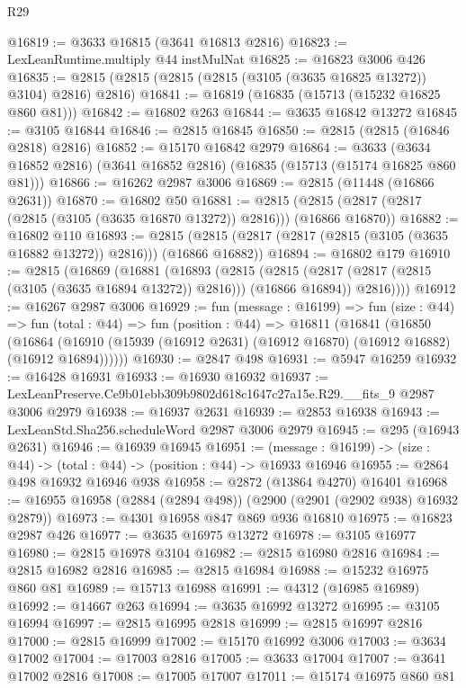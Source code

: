 \begin{lexlean}{R29}
\begin{coremodule}
@16819 := @3633 @16815 (@3641 @16813 @2816)
@16823 := LexLeanRuntime.multiply @44 instMulNat
@16825 := @16823 @3006 @426
@16835 := @2815 (@2815 (@2815 (@2815 (@3105 (@3635 @16825 @13272)) @3104) @2816) @2816)
@16841 := @16819 (@16835 (@15713 (@15232 @16825 @860 @81)))
@16842 := @16802 @263
@16844 := @3635 @16842 @13272
@16845 := @3105 @16844
@16846 := @2815 @16845
@16850 := @2815 (@2815 (@16846 @2818) @2816)
@16852 := @15170 @16842 @2979
@16864 := @3633 (@3634 @16852 @2816) (@3641 @16852 @2816) (@16835 (@15713 (@15174 @16825 @860 @81)))
@16866 := @16262 @2987 @3006
@16869 := @2815 (@11448 (@16866 @2631))
@16870 := @16802 @50
@16881 := @2815 (@2815 (@2817 (@2817 (@2815 (@3105 (@3635 @16870 @13272)) @2816))) (@16866 @16870))
@16882 := @16802 @110
@16893 := @2815 (@2815 (@2817 (@2817 (@2815 (@3105 (@3635 @16882 @13272)) @2816))) (@16866 @16882))
@16894 := @16802 @179
@16910 := @2815
    (@16869
      (@16881
        (@16893
          (@2815
            (@2815 (@2817 (@2817 (@2815 (@3105 (@3635 @16894 @13272)) @2816))) (@16866 @16894))
            @2816))))
@16912 := @16267 @2987 @3006
@16929 := fun (message : @16199) =>
  fun (size : @44) =>
  fun (total : @44) =>
  fun (position : @44) =>
  @16811
    (@16841
      (@16850
        (@16864 (@16910 (@15939 (@16912 @2631) (@16912 @16870) (@16912 @16882) (@16912 @16894))))))
@16930 := @2847 @498
@16931 := @5947 @16259
@16932 := @16428 @16931
@16933 := @16930 @16932
@16937 := LexLeanPreserve.Ce9b01ebb309b9802d618c1647c27a15e.R29.__fits_9 @2987 @3006 @2979
@16938 := @16937 @2631
@16939 := @2853 @16938
@16943 := LexLeanStd.Sha256.scheduleWord @2987 @3006 @2979
@16945 := @295 (@16943 @2631)
@16946 := @16939 @16945
@16951 := (message : @16199) -> (size : @44) -> (total : @44) -> (position : @44) -> @16933 @16946
@16955 := @2864 @498 @16932 @16946 @938
@16958 := @2872 (@13864 @4270) @16401
@16968 := @16955 @16958 (@2884 (@2894 @498)) (@2900 (@2901 (@2902 @938) @16932 @2879))
@16973 := @4301 @16958 @847 @869 @936 @16810
@16975 := @16823 @2987 @426
@16977 := @3635 @16975 @13272
@16978 := @3105 @16977
@16980 := @2815 @16978 @3104
@16982 := @2815 @16980 @2816
@16984 := @2815 @16982 @2816
@16985 := @2815 @16984
@16988 := @15232 @16975 @860 @81
@16989 := @15713 @16988
@16991 := @4312 (@16985 @16989)
@16992 := @14667 @263
@16994 := @3635 @16992 @13272
@16995 := @3105 @16994
@16997 := @2815 @16995 @2818
@16999 := @2815 @16997 @2816
@17000 := @2815 @16999
@17002 := @15170 @16992 @3006
@17003 := @3634 @17002
@17004 := @17003 @2816
@17005 := @3633 @17004
@17007 := @3641 @17002 @2816
@17008 := @17005 @17007
@17011 := @15174 @16975 @860 @81

\end{coremodule}
\end{lexlean}
